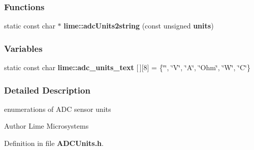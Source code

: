 \subsubsection*{Functions}
\begin{DoxyCompactItemize}
\item 
static const char $\ast$ {\bf lime\+::adc\+Units2string} (const unsigned {\bf units})
\end{DoxyCompactItemize}
\subsubsection*{Variables}
\begin{DoxyCompactItemize}
\item 
static const char {\bf lime\+::adc\+\_\+units\+\_\+text} [$\,$][8] = \{\char`\"{}\char`\"{}, \char`\"{}V\char`\"{}, \char`\"{}A\char`\"{}, \char`\"{}Ohm\char`\"{}, \char`\"{}W\char`\"{}, \char`\"{}C\char`\"{}\}
\end{DoxyCompactItemize}


\subsubsection{Detailed Description}
enumerations of A\+DC sensor units 

\begin{DoxyAuthor}{Author}
Lime Microsystems 
\end{DoxyAuthor}


Definition in file {\bf A\+D\+C\+Units.\+h}.

